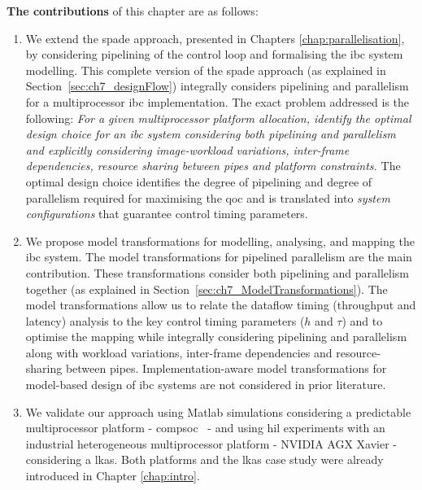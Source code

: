 \noindent \textbf{The contributions} of this chapter are as follows:
\begin{enumerate}
\item We extend the \gls{spade} approach, presented in Chapters \ref{chap:parallelisation}, by considering pipelining of the control loop and formalising the \gls{ibc} system modelling. This complete version of the \gls{spade} approach (as explained in Section~\ref{sec:ch7_designFlow}) integrally considers pipelining and parallelism for a multiprocessor \gls{ibc} implementation. 
The exact problem addressed is the following: \textit{For a given multiprocessor platform allocation, identify the optimal design choice for an \gls{ibc} system considering both pipelining and parallelism and explicitly considering image-workload variations, inter-frame dependencies, resource sharing between pipes and platform constraints.}
    The optimal design choice identifies the degree of pipelining and degree of parallelism required for maximising the \gls{qoc} and is translated into \textit{system configurations} that guarantee control timing parameters.
    \item We propose model transformations for modelling, analysing, and mapping the \gls{ibc} system. 
The model transformations for pipelined parallelism  are the main contribution. These transformations consider both pipelining and parallelism together (as explained in Section~\ref{sec:ch7_ModelTransformations}). 
    The model transformations allow us to relate the dataflow timing (throughput and latency) analysis to the key control timing parameters ($h$ and $\tau$) and to optimise the mapping while integrally considering pipelining and parallelism along with workload variations, inter-frame dependencies and resource-sharing between pipes.
    Implementation-aware model transformations for model-based design of \gls{ibc} systems are not considered in prior literature.
    \item We validate our approach using Matlab simulations considering a predictable multiprocessor platform - \gls{compsoc}~\cite{hansson2009compsoc} - and using \gls{hil} experiments with an industrial heterogeneous multiprocessor platform - NVIDIA AGX Xavier - considering a \gls{lkas}. Both platforms and the \gls{lkas} case study were already introduced in Chapter \ref{chap:intro}. 
\end{enumerate}

